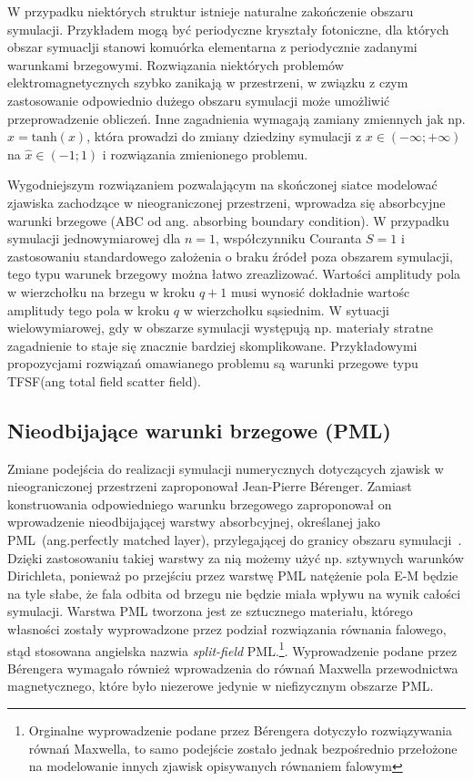 W przypadku niektórych struktur istnieje naturalne zakończenie obszaru symulacji. Przykładem mogą być periodyczne kryształy fotoniczne, dla których obszar symuaclji stanowi komuórka elementarna z periodycznie zadanymi warunkami brzegowymi. Rozwiązania niektórych problemów elektromagnetycznych szybko zanikają w przestrzeni, w związku z czym zastosowanie odpowiednio dużego obszaru symulacji może umożliwić przeprowadzenie obliczeń. Inne zagadnienia wymagają zamiany zmiennych  jak np. $\hat{x}=\textrm{tanh}(x)$, która prowadzi do zmiany dziedziny symulacji z $x\in(- \infty; + \infty)$ na $\hat{x}\in(-1;1)$ i rozwiązania zmienionego problemu. 

Wygodniejszym rozwiązaniem pozwalającym na skończonej siatce modelować zjawiska zachodzące w nieograniczonej przestrzeni, wprowadza się absorbcyjne warunki brzegowe (ABC od ang. absorbing boundary condition). W przypadku symulacji jednowymiarowej dla $n=1$, współczynniku Couranta $S=1$ i zastosowaniu standardowego założenia o braku źródeł poza obszarem symulacji, tego typu warunek brzegowy można łatwo zreazlizować. Wartości amplitudy pola w wierzchołku na brzegu w kroku $q+1$ musi wynosić dokładnie wartośc amplitudy tego pola w kroku $q$ w wierzchołku sąsiednim. W sytuacji wielowymiarowej, gdy w obszarze symulacji występują np. materiały stratne zagadnienie to staje się znacznie bardziej skomplikowane. Przykładowymi propozycjami rozwiązań omawianego problemu są warunki przegowe typu TFSF(ang total field scatter field).

\subsection{Nieodbijające warunki brzegowe (PML)}
\label{art:pml}
Zmiane podejścia do realizacji symulacji numerycznych dotyczących zjawisk w nieograniczonej przestrzeni zaproponował Jean-Pierre B\'{e}renger. Zamiast konstruowania odpowiedniego warunku brzegowego zaproponował on wprowadzenie nieodbijającej warstwy absorbcyjnej, określanej jako PML~(ang.perfectly matched layer), przylegającej do granicy obszaru symulacji~\cite{1994JCoPh.114..185B}. Dzięki zastosowaniu takiej warstwy za nią możemy użyć np. sztywnych warunków Dirichleta, ponieważ po przejściu przez warstwę PML natężenie pola E-M będzie na tyle słabe, że fala odbita od brzegu nie będzie miała wpływu na wynik całości symulacji. Warstwa PML tworzona jest ze sztucznego materiału, którego własności zostały wyprowadzone przez podział rozwiązania równania falowego,  stąd stosowana angielska nazwia {\it split-field} PML.\footnote{Orginalne wyprowadzenie podane przez B\'{e}rengera dotyczyło rozwiązywania równań Maxwella, to samo podejście zostało jednak bezpośrednio przełożone na modelowanie innych zjawisk opisywanych równaniem falowym}.  Wyprowadzenie podane przez B\'{e}rengera  wymagało również wprowadzenia do równań Maxwella przewodnictwa magnetycznego, które było niezerowe jedynie w niefizycznym obszarze PML.


